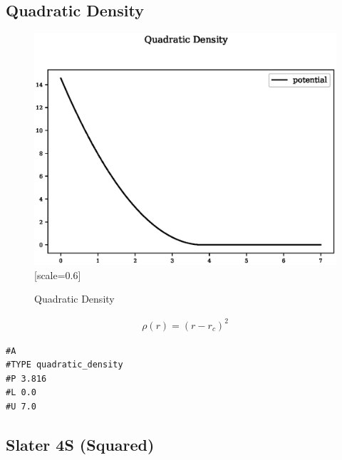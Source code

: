 \documentclass[12pt,twoside]{manual}
\begin{document}
\begin{appendices}
\subsection{Quadratic Density}

\begin{figure}[h]
  \begin{center}
    \includegraphics{img/plots/quadratic_density.eps}[scale=0.6]
    \caption{Quadratic Density}
    \label{graph:graph1}
  \end{center}
\end{figure}

\begin{equation}
\begin{split}
\rho(r) = (r - r_c)^2 
\end{split}
\label{eq:quadraticDensity}
\end{equation}

\begin{lstlisting}[style=pseudocode,caption={Quadratic Density}]
#A
#TYPE quadratic_density
#P 3.816
#L 0.0
#U 7.0
\end{lstlisting}


\subsection{Slater 4S (Squared)}


\end{appendices}
\end{document}
